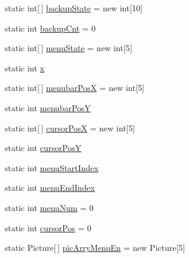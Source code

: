 \begin{DoxyCompactItemize}
\item 
static int\mbox{[}$\,$\mbox{]} \hyperlink{classkr_1_1ac_1_1kookmin_1_1cs_1_1hud_1_1_h_u_d_management_a2e980ba0f951c11c7b41190197f138fb}{backup\+State} = new int\mbox{[}10\mbox{]}
\item 
static int \hyperlink{classkr_1_1ac_1_1kookmin_1_1cs_1_1hud_1_1_h_u_d_management_a4d8dcd83fa46fb810848d39518bd2a89}{backup\+Cnt} = 0
\item 
static int\mbox{[}$\,$\mbox{]} \hyperlink{classkr_1_1ac_1_1kookmin_1_1cs_1_1hud_1_1_h_u_d_management_a1f856e5328f0219dbb586c5297b6b62b}{menu\+State} = new int\mbox{[}5\mbox{]}
\item 
static int \hyperlink{classkr_1_1ac_1_1kookmin_1_1cs_1_1hud_1_1_h_u_d_management_a3a60a8d9a72d5d242796fdaa9c76905d}{x}
\item 
static int\mbox{[}$\,$\mbox{]} \hyperlink{classkr_1_1ac_1_1kookmin_1_1cs_1_1hud_1_1_h_u_d_management_a56a670048b3af508378ccfaab214893e}{menubar\+Pos\+X} = new int\mbox{[}5\mbox{]}
\item 
static int \hyperlink{classkr_1_1ac_1_1kookmin_1_1cs_1_1hud_1_1_h_u_d_management_a642380be5c9dd050a5678665b2c2e2fa}{menubar\+Pos\+Y}
\item 
static int\mbox{[}$\,$\mbox{]} \hyperlink{classkr_1_1ac_1_1kookmin_1_1cs_1_1hud_1_1_h_u_d_management_a62b6b5ec5cb0eae74acaacccd2c3bee6}{cursor\+Pos\+X} = new int\mbox{[}5\mbox{]}
\item 
static int \hyperlink{classkr_1_1ac_1_1kookmin_1_1cs_1_1hud_1_1_h_u_d_management_a1bc74f45485b6a429e54e8be6a66b6b1}{cursor\+Pos\+Y}
\item 
static int \hyperlink{classkr_1_1ac_1_1kookmin_1_1cs_1_1hud_1_1_h_u_d_management_ab9d252f0b80e76c4930b8e0fd288f019}{menu\+Start\+Index}
\item 
static int \hyperlink{classkr_1_1ac_1_1kookmin_1_1cs_1_1hud_1_1_h_u_d_management_aa53116bd342eeee2ab96d1edabf5561d}{menu\+End\+Index}
\item 
static int \hyperlink{classkr_1_1ac_1_1kookmin_1_1cs_1_1hud_1_1_h_u_d_management_af69baaadf8bdb8b4f429269357fb84d9}{menu\+Num} = 0
\item 
static int \hyperlink{classkr_1_1ac_1_1kookmin_1_1cs_1_1hud_1_1_h_u_d_management_a138d02aacf241cd6234acfc9512f78aa}{cursor\+Pos} = 0
\item 
static Picture\mbox{[}$\,$\mbox{]} \hyperlink{classkr_1_1ac_1_1kookmin_1_1cs_1_1hud_1_1_h_u_d_management_accf7a9ec5092e5872460755f3b81d6d5}{pic\+Arry\+Menu\+En} = new Picture\mbox{[}5\mbox{]}
\item 

\end{DoxyCompactItemize}
